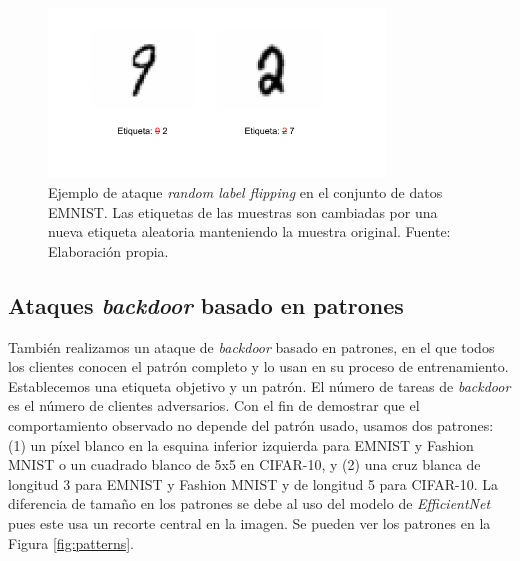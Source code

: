 \begin{figure}[h!]
    \centering
    \includegraphics[width=0.8\textwidth]{figuras/labelflipping.pdf}
    \caption{Ejemplo de ataque \textit{random label flipping} en el conjunto de datos EMNIST. Las etiquetas de las muestras son cambiadas por una nueva etiqueta aleatoria manteniendo la muestra original. Fuente: Elaboración propia.}
    \label{fig:enter-label}
\end{figure}

\subsection{Ataques \textit{backdoor} basado en patrones}
También realizamos un ataque de \textit{backdoor} basado en patrones, en el que todos los clientes conocen el patrón completo y lo usan en su proceso de entrenamiento. Establecemos una etiqueta objetivo y un patrón. El número de tareas de \textit{backdoor} es el número de clientes adversarios. Con el fin de demostrar que el comportamiento observado no depende del patrón usado, usamos dos patrones: (1) un píxel blanco en la esquina inferior izquierda para EMNIST y Fashion MNIST o un cuadrado blanco de 5x5 en CIFAR-10, y (2) una cruz blanca de longitud 3 para EMNIST y Fashion MNIST y de longitud 5 para CIFAR-10. La diferencia de tamaño en los patrones se debe al uso del modelo de \textit{EfficientNet} pues este usa un recorte central en la imagen. Se pueden ver los patrones en la Figura \ref{fig:patterns}.

